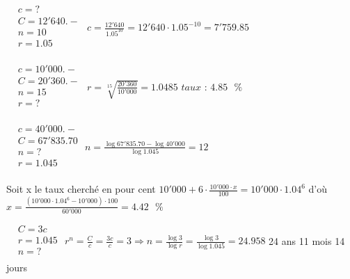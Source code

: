 \begin{solution}
$\begin{array}{ll}
  & c=? \\ 
 & C=12'640.- \\ 
 & n=10 \\ 
 & r=1.05 \\ 
\end{array}$	
$c=\frac{12'640}{{{1.05}^{10}}}=12'640\cdot {{1.05}^{-10}}=7'759.85$
\end{solution}

\begin{solution}
$\begin{array}{ll}
  & c=10'000.- \\ 
 & C=20'360.- \\ 
 & n=15 \\ 
 & r=? \\ 
\end{array}$	
$r=\sqrt[15]{\frac{20'360}{10'000}}=1.0485$	$taux\text{ : }4.85\text{ }\%$
\end{solution}

\begin{solution}
$\begin{array}{ll}
  & c=40'000.- \\ 
 & C=67'835.70 \\ 
 & n=? \\ 
 & r=1.045 \\ 
\end{array}$	
$n=\frac{\log 67'835.70-\log 40'000}{\log 1.045}=12$
\end{solution}

\begin{solution}
Soit x le taux cherché en pour cent
$10'000+6\cdot \frac{10'000\cdot x}{100}=10'000\cdot {{1.04}^{6}}$  d’où $x=\frac{\left( 10'000\cdot {{1.04}^{6}}-10'000 \right)\cdot 100}{60'000}=4.42\text{ }\%$
\end{solution}

\begin{solution}
 $\begin{array}{ll}
  & C=3c \\ 
 & r=1.045 \\ 
 & n=? \\ 
\end{array}$	${{r}^{n}}=\frac{C}{c}=\frac{3c}{c}=3\Rightarrow n=\frac{\log 3}{\log r}=\frac{\log 3}{\log 1.045}=24.958$  24 ans 11 mois 14 jours
\end{solution}

